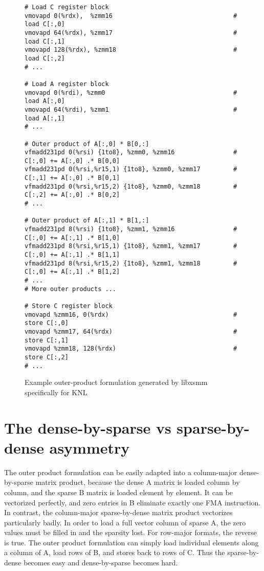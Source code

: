 \begin{figure}[ht]
\begin{verbatim}
# Load C register block
vmovapd 0(%rdx),  %zmm16                                 # load C[:,0]
vmovapd 64(%rdx), %zmm17                                 # load C[:,1]
vmovapd 128(%rdx), %zmm18                                # load C[:,2]
# ...

# Load A register block
vmovapd 0(%rdi), %zmm0                                   # load A[:,0]
vmovapd 64(%rdi), %zmm1                                  # load A[:,1]
# ...

# Outer product of A[:,0] * B[0,:]
vfmadd231pd 0(%rsi) {1to8}, %zmm0, %zmm16                # C[:,0] += A[:,0] .* B[0,0]
vfmadd231pd 0(%rsi,%r15,1) {1to8}, %zmm0, %zmm17         # C[:,1] += A[:,0] .* B[0,1]
vfmadd231pd 0(%rsi,%r15,2) {1to8}, %zmm0, %zmm18         # C[:,2] += A[:,0] .* B[0,2]
# ...

# Outer product of A[:,1] * B[1,:]
vfmadd231pd 8(%rsi) {1to8}, %zmm1, %zmm16                # C[:,0] += A[:,1] .* B[1,0]
vfmadd231pd 8(%rsi,%r15,1) {1to8}, %zmm1, %zmm17         # C[:,0] += A[:,1] .* B[1,1]
vfmadd231pd 8(%rsi,%r15,2) {1to8}, %zmm1, %zmm18         # C[:,0] += A[:,1] .* B[1,2]
# ...
# More outer products ...

# Store C register block
vmovapd %zmm16, 0(%rdx)                                  # store C[:,0]
vmovapd %zmm17, 64(%rdx)                                 # store C[:,1]
vmovapd %zmm18, 128(%rdx)                                # store C[:,2]
# ...
\end{verbatim}
\caption{Example outer-product formulation generated by libxsmm specifically for KNL}
\label{fig:outerproduct}
\end{figure}



\section{The dense-by-sparse vs sparse-by-dense asymmetry}
\label{section:asymmetry}

The outer product formulation can be easily adapted into a column-major dense-by-sparse matrix product, because the dense A matrix is loaded column by column, and the sparse B matrix is loaded element by element. It can be vectorized perfectly, and zero entries in B eliminate exactly one FMA instruction. In contrast, the column-major sparse-by-dense matrix product vectorizes particularly badly. In order to load a full vector column of sparse A, the zero values must be filled in and the sparsity lost. For row-major formats, the reverse is true. The outer product formulation can simply load individual elements along a column of A, load rows of B, and stores back to rows of C. Thus the sparse-by-dense becomes easy and dense-by-sparse becomes hard. 

